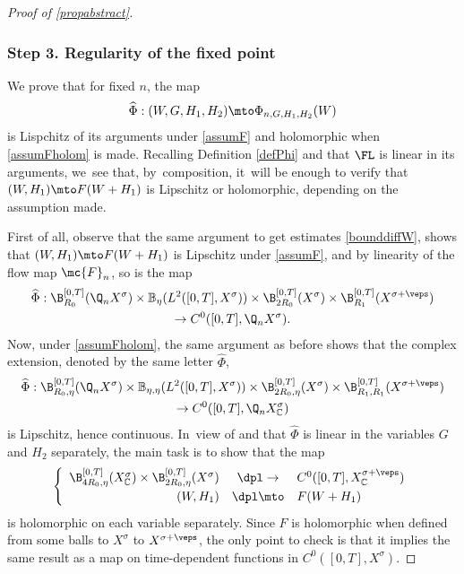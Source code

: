 \begin{proof}[Proof of \cref{propabstract}]
\subsubsection*{Step 3. Regularity of the fixed point} We prove that for fixed $n$, the map
\[
\widehat{\Phi}: (W, G, H_1, H_2)\mto \Phi_{n, G, H_1, H_2}(W)
\]
is Lispchitz of its arguments under \cref{assumF} and holomorphic when \cref{assumFholom} is made.
Recalling Definition \eqref{defPhi} and that $\FL$ is linear in its arguments, we~see that, by~composition, it~will be enough to verify that $(W,H_1)\mto F(W+H_{1})$ is Lipschitz or holomorphic, depending on the assumption made.

First of all, observe that the same argument to get estimates \eqref{bounddiffW}, shows that $(W,H_1)\mto F(W+H_{1})$ is Lipschitz under \cref{assumF}, and by linearity of the flow map $\mc{F}_n$, so is the map
\begin{multline*}
\widehat{\Phi}: \B_{R_0}^{[0, T]}(\Q_n X^{\sigma})\times \mathbb{B}_{\eta}(L^{2}([0,T],X^{\sigma}))\times \B_{2R_{0}}^{[0,T]}(X^{\sigma}) \times \B_{R_{1}}^{[0,T]}(X^{\sigma+\veps})\\
\to C^0([0, T], \Q_{n }X^{\sigma}).
\end{multline*}
Now, under \cref{assumFholom}, the same argument as before shows that the complex extension, denoted by the same letter $\widehat{\Phi}$,
\begin{multline*}
\widehat{\Phi}: \B_{R_0, \eta}^{[0, T]}(\Q_n X^{\sigma})\times \mathbb{B}_{\eta,\eta}(L^{2}([0,T],X^{\sigma}))\times \B_{2R_{0},\eta}^{[0,T]}(X^{\sigma}) \times \B_{R_{1}, R_{1}}^{[0,T]}(X^{\sigma+\veps})\\ \to C^0([0, T], \Q_{n }X_\mathbb{C}^{\sigma})
\end{multline*}
is Lipschitz, hence continuous. In~view of \cite[Prop.\,8.10]{Muj86} and that $\widehat{\Phi}$ is linear in the variables $G$ and $H_2$ separately, the main task is to show that the map
\begin{align}
\left\{\begin{array}{rcl}
\B_{4R_{0}, \eta}^{[0,T]}(X_{\mathbb{C}}^{\sigma}) \times \B_{2R_{0}, \eta}^{[0,T]}(X^{\sigma}) & \dpl\to& C^0([0, T], X_\mathbb{C}^{\sigma+\veps})\\[3pt]
(W, H_1 )&\dpl\mto& F(W+H_1)
\end{array}\right.
\end{align}
is holomorphic on each variable separately. Since $F$ is holomorphic when defined from some balls to $X^\sigma$ to $X^{\sigma+\veps}$, the only point to check is that it implies the same result as a map on time-dependent functions in $C^0([0,T],X^\sigma)$.


\end{proof}
